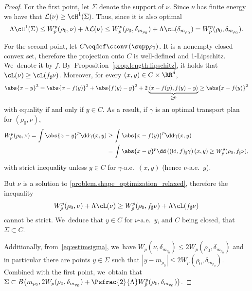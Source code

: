 \begin{proof}
For the first point, let $\Sigma$ denote the support of $\nu$. Since $\nu$ has finite energy we have that $\mathcal{L}(\nu) \geq \cH^1(\Sigma)$. Thus, since it is also optimal
\begin{equation}\label{eq:estimsigma}
\Lambda \cH^1(\Sigma)
\leq
W^p_p(\rho_0,\nu)+\Lambda \mathcal{L}(\nu) \le
W^p_p(\rho_0,\delta_{m_{\rho_0}})+\Lambda \cL(\delta_{m_{\rho_0}}) = W^p_p(\rho_0,\delta_{m_{\rho_0}}).
\end{equation}

For the second point, let $C\eqdef \cconv\left(\supp \rho_0\right)$. It is a nonempty closed convex set, therefore the projection onto $C$ is well-defined and 1-Lipschitz. We~denote it by $f$. By~Proposition~\ref{prop.length.lipschitz}, it holds that $\cL(\nu)\geq \cL(f_\sharp \nu)$. Moreover, for every $(x,y)\in C\times \RR^d$,
\begin{equation*}
\abs{x-y}^2 =\abs{x-f(y)}^2 + \abs{f(y)-y}^2 +2\underbrace{\left\langle{x-f(y)},{f(y)-y}\right\rangle}_{\geq 0}\geq \abs{x-f(y)}^2
\end{equation*}
with equality if and only if $y \in C$. As a result, if $\gamma$ is an optimal transport plan for $(\rho_0,\nu)$,
\begin{align*}
W_p^p(\rho_0,\nu)= \int \abs{x-y}^p\dd \gamma(x,y) &\geq \int \abs{x-f(y)}^p\dd \gamma(x,y) \\
&=\int \abs{x-y}^p\dd\left((\text{id},f)_\sharp \gamma\right)(x,y) \geq W_p^p(\rho_0,f_\sharp\nu),
\end{align*}
with strict inequality unless $y \in C$ for $\gamma$-a.e.\ $(x,y)$ (hence $\nu$-a.e.\ $y$).

But $\nu$ is a solution to \eqref{problem.shape_optimization_relaxed}, therefore the inequality
\begin{equation*}
W_p^p(\rho_0,\nu)+ \Lambda \cL(\nu)\geq W_p^p(\rho_0,f_\sharp\nu)+ \Lambda \cL(f_\sharp \nu)
\end{equation*}
cannot be strict. We~deduce that $y \in C$ for $\nu$-a.e.\ $y$, and $C$ being closed, that $\Sigma \subset C$.

Additionally, from~\eqref{eq:estimsigma}, we~have
$W_p(\nu,\delta_{m_{\rho_0}})\le 2 W_p(\rho_0,\delta_{m_{\rho_0}})$ and
in particular there are points $y\in \Sigma$ such that
$|y-m_{\rho_0}|\le 2 W_p(\rho_0,\delta_{m_{\rho_0}})$. Combined
with the first point, we~obtain that $\Sigma\subset
B\big({m_{\rho_0}},2W_p(\rho_0,\delta_{m_{\rho_0}})
+ \Psfrac{2}{\Lambda}W_p^p(\rho_0,\delta_{m_{\rho_0}})\big)$.
\end{proof}

